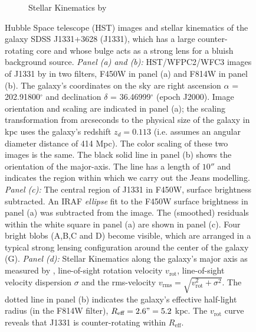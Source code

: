 \begin{figure}
\begin{subfigure}{.5\textwidth}
  \caption{Stellar Kinematics by \citet{SWELLSV}}
  \label{fig:kinematics}
\end{subfigure}
\caption{Hubble Space telescope (HST) images and stellar kinematics of the galaxy SDSS J1331+3628 (J1331), which has a large counter-rotating core and whose bulge acts as a strong lens for a bluish background source. \emph{Panel (a) and (b):} HST/WFPC2/WFC3 images of J1331 by \citet{SWELLSI} in two filters, F450W in panel (a) and F814W in panel (b). The galaxy's coordinates on the sky are right ascension $\alpha$ = 202.91800$^\circ$ and declination $\delta$ = 36.46999$^\circ$ (epoch J2000). Image orientation and scaling are indicated in panel (a); the scaling transformation from arcseconds to the physical size of the galaxy in kpc uses the galaxy's redshift $z_d = 0.113$ \citep{SWELLSIII} (i.e. assumes an angular diameter distance of 414 Mpc). The color scaling of these two images is the same. The black solid line in panel (b) shows the orientation of the major-axis. The line has a length of $10''$ and indicates the region within which we carry out the Jeans modelling. \emph{Panel (c):} The central region of J1331 in F450W, surface brightness subtracted. An IRAF \emph{ellipse} fit to the F450W surface brightness in panel (a) was subtracted from the image. The (smoothed) residuals within the white square in panel (a) are shown in panel (c). Four bright blobs (A,B,C and D) become visible, which are arranged in a typical strong lensing configuration around the center of the galaxy (G). \emph{Panel (d):} Stellar Kinematics along the galaxy's major axis as measured by \citet{SWELLSV}, line-of-sight rotation velocity $v_\text{rot}$, line-of-sight velocity dispersion $\sigma$ and the rms-velocity $v_\text{rms} = \sqrt{v_\text{rot}^2 + \sigma^2}$. The dotted line in panel (b) indicates the galaxy's effective half-light radius (in the F814W filter), $R_\text{eff} = 2.6" = 5.2$ kpc. The $v_\text{rot}$ curve reveals that J1331 is counter-rotating within $R_\text{eff}$.  }
\label{fig:specialJ1331}
\end{figure}